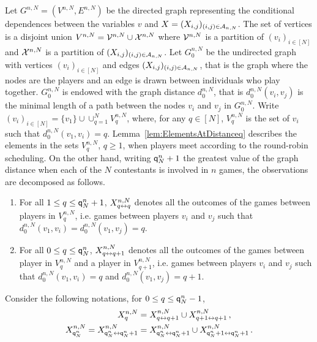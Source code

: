 Let $G^{n,N}=(V^{n,N},E^{n,N})$ be the directed graph representing the conditional dependences between the variables $v$ and $X=(X_{i,j})_{(i,j)\in \mathcal{A}_{n,N}}$. The set of vertices is a disjoint union $V^{n,N}=\mathcal{V}^{n,N}\cup \mathcal{X}^{n,N}$ where $\mathcal{V}^{n,N}$ is a partition of $(v_i)_{i\in[N]}$ and $\mathcal{X}^{n,N}$ is a partition of $(X_{i,j})_{(i,j)\in \mathcal{A}_{n,N}}$. Let $G_0^{n,N}$ be the undirected graph with vertices $(v_i)_{i\in[N]}$ and edges $(X_{i,j})_{ (i,j)\in \mathcal{A}_{n,N}}$, that is the graph where the nodes are the players and an edge is drawn between individuals who play together. $G_0^{n,N}$ is endowed with the graph distance $d^{n,N}_0$, that is $d^{n,N}_0(v_i,v_j)$ is the minimal length of a path between the nodes $v_i$ and $v_j$ in $G_0^{n,N}$. Write $(v_i)_{i\in[N]}=\{v_1\}\cup\cup_{q=1}^{N}V^{n,N}_{q}$, where, for any $q\in[N]$, $V^{n,N}_{q}$ is the set of $v_i$ such that $d^{n,N}_0(v_1,v_i)=q$. Lemma~\ref{lem:ElementsAtDistanceq} describes the elements in the sets $V_{q}^{n,N}$, $q\ge 1$, when players meet according to the round-robin scheduling. On the other hand, writing ${\mathsf{q}}^{n}_{N}+1$ the greatest value of the graph distance when each of the $N$ contestants is involved in $n$ games, the observations are decomposed as follows.
\begin{enumerate}[-]
\item For all $1\le q \le {\mathsf{q}}^{n}_{N}+1$, $X^{n,N}_{q\leftrightarrow q}$ denotes all the outcomes of the games between players in $V^{n,N}_{q}$, i.e. games between players $v_i$ and $v_j$ such that $d^{n,N}_0(v_1,v_i) = d^{n,N}_0(v_1,v_j)=q$.
\item For all $0\le q \le {\mathsf{q}}^{n}_{N}$, $X^{n,N}_{q\leftrightarrow q+1}$ denotes all the outcomes of the games between player in $V^{n,N}_{q}$ and a player in $V^{n,N}_{q+1}$, i.e. games between players $v_i$ and $v_j$ such that $d^{n,N}_0(v_1,v_i) = q$ and $d^{n,N}_0(v_1,v_j)=q+1$.
\end{enumerate} 
Consider the following notations, for $0\le q \le {\mathsf{q}}^{n}_{N}-1$,
\begin{align*}
X_{q}^{n,N}                   & = X_{q \leftrightarrow q+1}^{n,N}\cup X_{q+1\leftrightarrow q+1}^{n,N}\,,\\
X_{{\mathsf{q}}^{n}_{N}}^{n,N} = X_{{\mathsf{q}}^{n}_{N}\leftrightarrow{\mathsf{q}}^{n}_{N}+1}^{n,N} & = X_{{\mathsf{q}}^{n}_{N} \leftrightarrow {\mathsf{q}}^{n}_{N} +1}^{n,N}\cup X_{{\mathsf{q}}^{n}_{N}+1\leftrightarrow{\mathsf{q}}^{n}_{N}+1}^{n,N}\,.
\end{align*}
